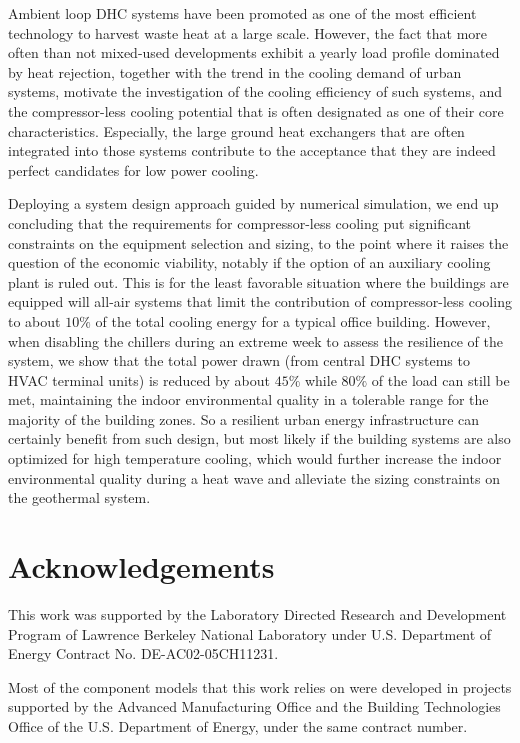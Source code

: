 Ambient loop DHC systems have been promoted as one of the most efficient technology to harvest waste heat at a large scale.
However, the fact that more often than not mixed-used developments exhibit a yearly load profile dominated by heat rejection, together with the trend in the cooling demand of urban systems, motivate the investigation of the cooling efficiency of such systems, and the compressor-less cooling potential that is often designated as one of their core characteristics.
Especially, the large ground heat exchangers that are often integrated into those systems contribute to the acceptance that they are indeed perfect candidates for low power cooling.

Deploying a system design approach guided by numerical simulation, we end up concluding that the requirements for compressor-less cooling put significant constraints on the equipment selection and sizing, to the point where it raises the question of the economic viability, notably if the option of an auxiliary cooling plant is ruled out.
This is for the least favorable situation where the buildings are equipped will all-air systems that limit the contribution of compressor-less cooling to about $10\%$ of the total cooling energy for a typical office building.
However, when disabling the chillers during an extreme week to assess the resilience of the system, we show that the total power drawn (from central DHC systems to HVAC terminal units) is reduced by about $45\%$ while $80\%$ of the load can still be met, maintaining the indoor environmental quality in a tolerable range for the majority of the building zones.
So a resilient urban energy infrastructure can certainly benefit from such design, but most likely if the building systems are also optimized for high temperature cooling, which would further increase the indoor environmental quality during a heat wave and alleviate the sizing constraints on the geothermal system.


\section{Acknowledgements} \label{sec:acknowledge}

This work was supported by the Laboratory Directed Research and Development Program of Lawrence Berkeley National Laboratory under U.S. Department of Energy Contract No. DE-AC02-05CH11231.

Most of the component models that this work relies on were developed in projects supported by the Advanced Manufacturing Office and the Building Technologies Office of the U.S. Department of Energy, under the same contract number.


